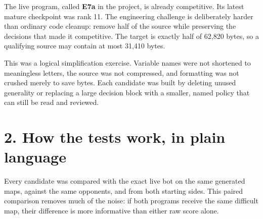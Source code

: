 \documentclass[10pt,a4paper]{article}
\begin{document}
The live program, called \textbf{E7a} in the project, is already competitive. Its latest mature
checkpoint was rank 11. The engineering challenge is deliberately harder than ordinary code
cleanup: remove half of the source while preserving the decisions that made it competitive.
The target is exactly half of 62,820 bytes, so a qualifying source may contain at most
31,410 bytes.

This was a logical simplification exercise. Variable names were not shortened to meaningless
letters, the source was not compressed, and formatting was not crushed merely to save bytes.
Each candidate was built by deleting unused generality or replacing a large decision block with
a smaller, named policy that can still be read and reviewed.

\section*{2. How the tests work, in plain language}

Every candidate was compared with the exact live bot on the same generated maps, against the
same opponents, and from both starting sides. This paired comparison removes much of the noise:
if both programs receive the same difficult map, their difference is more informative than
either raw score alone.
\end{document}
